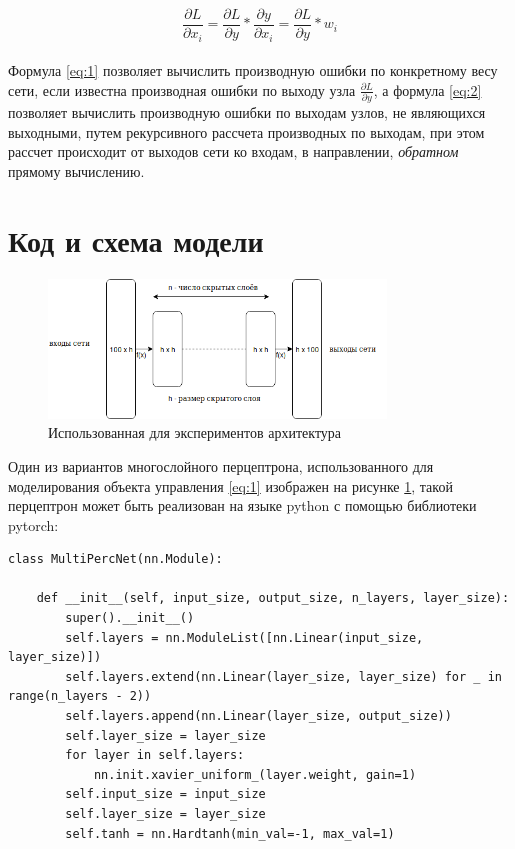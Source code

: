 \documentclass[12pt, oneside]{extbook}
\begin{document}
\begin{flushleft}
\begin{equation} \label {eq:3}
\frac{\partial L}{\partial x_{i}} = \frac{\partial L}{\partial y} * \frac{\partial y}{\partial x_{i}} = \frac{\partial L}{\partial y} * w_{i}
\end{equation}\\
Формула \ref{eq:1} позволяет вычислить производную ошибки по конкретному весу сети, если известна производная ошибки по выходу узла $\frac{\partial L}{\partial y}$, а формула \ref{eq:2} позволяет вычислить производную ошибки по выходам узлов, не являющихся выходными, путем рекурсивного рассчета производных по выходам, при этом рассчет происходит от выходов сети ко входам, в направлении, \textit{обратном} прямому вычислению.
\section{Код и схема модели}
\begin{figure}[h]
\centering
\includegraphics[width=0.8\textwidth]{multi_layer_perceptron}
\caption{Использованная для экспериментов архитектура}
\label{fig:my_multi_perceptron}
\end{figure}
Один из вариантов многослойного перцептрона, использованного для моделирования объекта управления \ref{eq:1} изображен на рисунке \ref{fig:my_multi_perceptron}, такой перцептрон может быть реализован на языке python с помощью библиотеки pytorch:
\pagebreak
\begin{verbatim}
class MultiPercNet(nn.Module):

    def __init__(self, input_size, output_size, n_layers, layer_size):
        super().__init__()
        self.layers = nn.ModuleList([nn.Linear(input_size, layer_size)])
        self.layers.extend(nn.Linear(layer_size, layer_size) for _ in range(n_layers - 2))
        self.layers.append(nn.Linear(layer_size, output_size))
        self.layer_size = layer_size
        for layer in self.layers:
            nn.init.xavier_uniform_(layer.weight, gain=1)
        self.input_size = input_size
        self.layer_size = layer_size
        self.tanh = nn.Hardtanh(min_val=-1, max_val=1)


\end{verbatim}
\end{flushleft}
\end{document}
